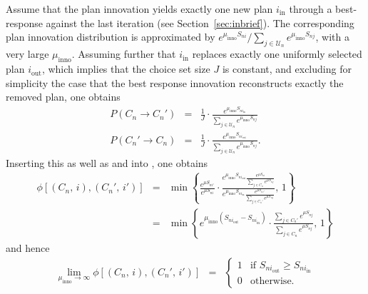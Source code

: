 Assume that the plan innovation yields exactly
one new plan $i_{\text{in}}$ through a best-response
%
%
against the
last iteration (see Section~\ref{sec:inbrief}).
%
%
The corresponding plan innovation distribution is
approximated by $e^{\mu_{\text{inno}}S_{ni}}/\sum_{j\in \mathcal{U}_n}e^{\mu_{\text{inno}}S_{nj}}$,
with a very large $\mu_{\text{inno}}$. Assuming further that $i_{\text{in}}$
replaces exactly one uniformly selected plan $i_{\text{out}}$, 
which implies that the choice set size $J$ is constant, 
and excluding for simplicity the case that the best response innovation
reconstructs exactly the removed plan,
one obtains
\begin{eqnarray}
P(C_{n}\rightarrow C_{n}') & = & \frac{1}{J}\cdot\frac{e^{\mu_{\text{inno}}S_{ni_{\text{in}}}}}{\sum_{j\in \mathcal{U}_n}e^{\mu_{\text{inno}}S_{nj}}}\\
P(C_{n}'\rightarrow C_{n}) & = & \frac{1}{J}\cdot\frac{e^{\mu_{\text{inno}}S_{ni_{\text{out}}}}}{\sum_{j\in \mathcal{U}_n}e^{\mu_{\text{inno}}S_{nj}}}.
\end{eqnarray}
Inserting this as well as  and 
into , one obtains 
\begin{eqnarray}
\phi[(C_{n},\, i),(C_{n}',\, i')] & = & 
\min\left\{ 
\frac{e^{\mu S_{ni'}}}{e^{\mu S_{ni}}}\cdot
\frac{{\displaystyle e^{\mu_{\text{inno}}S_{ni_{\text{out}}}}\frac{\displaystyle e^{\mu S_{ni}}}{\sum_{j\in C_{n}}\displaystyle e^{\mu S_{nj}}}}}
{{\displaystyle e^{\mu_{\text{inno}}S_{ni_{\text{in}}}}\frac{\displaystyle e^{\mu S_{ni'}}}{\sum_{j\in C_{n}'} \displaystyle e^{\mu S_{nj}}}}},\,1\right\} \\
 & = & 
 \min\left\{ 
 {\displaystyle e^{\mu_{\text{inno}}(S_{ni_{\text{out}}}-S_{ni_{\text{in}}})}} \cdot
 \frac{\sum_{j\in C_{n}'} \displaystyle e^{\mu S_{nj}}}{\sum_{j\in C_{n}} \displaystyle e^{\mu S_{nj}}},\,1\right\} 
\end{eqnarray}
and hence
\begin{eqnarray}
\label{eq:limiting-accept-proba}
\lim_{\mu_{\text{inno}}\rightarrow\infty}
\phi[(C_{n},\, i),(C_{n}',\, i')] & = & 
\begin{cases}
1 & \text{if } S_{ni_{\text{out}}}\geq S_{ni_{\text{in}}} \\
0 & \text{otherwise.}
\end{cases}
\end{eqnarray}
